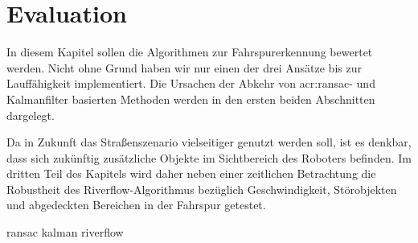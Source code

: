 \chapter{Evaluation \dcfirstauthorshort}
\label{cha:evaluation}

In diesem Kapitel sollen die Algorithmen zur Fahrspurerkennung bewertet werden. Nicht ohne Grund haben wir nur einen der drei Ansätze bis zur Lauffähigkeit implementiert. Die Ursachen der Abkehr von \gls{acr:ransac}- und Kalmanfilter basierten Methoden werden in den ersten beiden Abschnitten dargelegt. 

Da in Zukunft das Straßenszenario vielseitiger genutzt werden soll, ist es denkbar, dass sich zukünftig zusätzliche Objekte im Sichtbereich des Roboters befinden. Im dritten Teil des Kapitels wird daher neben einer zeitlichen Betrachtung die Robustheit des Riverflow-Algorithmus bezüglich Geschwindigkeit, Störobjekten und abgedeckten Bereichen in der Fahrspur getestet.

{ransac}
{kalman}
{riverflow}
